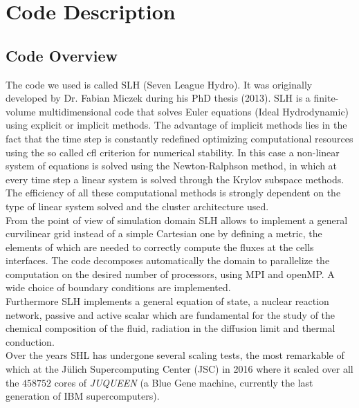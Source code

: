 \chapter{Code Description}
\section{Code Overview}

The code we used is called SLH (Seven League Hydro). It was originally developed by Dr. Fabian Miczek during his PhD thesis (2013). SLH is a finite-volume multidimensional code that solves Euler equations (Ideal Hydrodynamic) using explicit or implicit methods. The advantage of implicit methods lies in the fact that the time step is constantly redefined optimizing computational resources using the so called cfl criterion for numerical stability. In this case a non-linear system of equations is solved using the Newton-Ralphson method, in which at every time step a linear system is solved through the Krylov subspace methods. The efficiency of all these computational methods is strongly dependent on the type of linear system solved and the cluster architecture used. \\
From the point of view of simulation domain SLH allows to implement a general curvilinear grid instead of a simple Cartesian one by defining a metric, the elements of which are needed to correctly compute the fluxes at the cells interfaces. The code decomposes automatically the domain to parallelize the computation on the desired number of processors, using MPI and openMP. A wide choice of boundary conditions are implemented. \\
Furthermore SLH implements a general equation of state, a nuclear reaction network, passive and active scalar which are fundamental for the study of the chemical composition of the fluid, radiation in the diffusion limit and thermal conduction. \\
Over the years SHL has undergone several scaling tests, the most remarkable of which at the Jülich Supercomputing Center (JSC) in 2016 where it scaled over all the $458752$ cores of \textit{JUQUEEN} (a Blue Gene machine, currently the last generation of IBM supercomputers).

